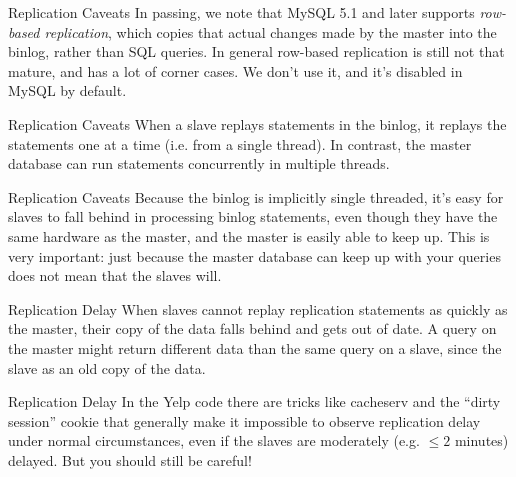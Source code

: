 \documentclass[14pt]{beamer}
\begin{document}
\begin{frame}{Replication Caveats}
  In passing, we note that MySQL 5.1 and later supports \emph{row-based
    replication}, which copies that actual changes made by the master into the
  binlog, rather than SQL queries.
  \newline
  \newline
  In general row-based replication is still not that mature, and has a lot of
  corner cases. We don't use it, and it's disabled in MySQL by default.
\end{frame}

\begin{frame}{Replication Caveats}
  When a slave replays statements in the binlog, it replays the statements one
  at a time (i.e. from a single thread). In contrast, the master database can
  run statements concurrently in multiple threads.
\end{frame}

\begin{frame}{Replication Caveats}
  Because the binlog is implicitly single threaded, it's easy for slaves to fall
  behind in processing binlog statements, even though they have the same
  hardware as the master, and the master is easily able to keep up.
  \newline
  \newline
  This is very important: just because the master database can keep up with your
  queries does not mean that the slaves will.
\end{frame}

\begin{frame}{Replication Delay}
  When slaves cannot replay replication statements as quickly as the master,
  their copy of the data falls behind and gets out of date.
  \newline
  \newline
  A query on the master might return different data than the same query on a
  slave, since the slave as an old copy of the data.
\end{frame}

\begin{frame}{Replication Delay}
  In the Yelp code there are tricks like cacheserv and the ``dirty session''
  cookie that generally make it impossible to observe replication delay under
  normal circumstances, even if the slaves are moderately (e.g. $\le 2$ minutes)
  delayed.
  \newline
  \newline
  But you should still be careful!
\end{frame}
\end{document}
